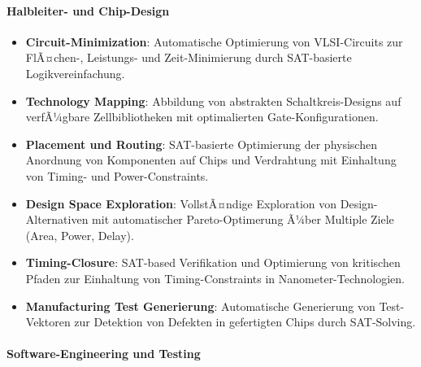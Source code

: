 ﻿\documentclass[a4paper,12pt]{article}
\theoremstyle{definition}
\begin{document}
\paragraph{Halbleiter- und Chip-Design}

\begin{itemize}
	\item \textbf{Circuit-Minimization}: Automatische Optimierung von VLSI-Circuits zur FlÃ¤chen-, Leistungs- und Zeit-Minimierung durch SAT-basierte Logikvereinfachung.
	
	\item \textbf{Technology Mapping}: Abbildung von abstrakten Schaltkreis-Designs auf verfÃ¼gbare Zellbibliotheken mit optimalierten Gate-Konfigurationen.
	
	\item \textbf{Placement und Routing}: SAT-basierte Optimierung der physischen Anordnung von Komponenten auf Chips und Verdrahtung mit Einhaltung von Timing- und Power-Constraints.
	
	\item \textbf{Design Space Exploration}: VollstÃ¤ndige Exploration von Design-Alternativen mit automatischer Pareto-Optimerung Ã¼ber Multiple Ziele (Area, Power, Delay).
	
	\item \textbf{Timing-Closure}: SAT-based Verifikation und Optimierung von kritischen Pfaden zur Einhaltung von Timing-Constraints in Nanometer-Technologien.
	
	\item \textbf{Manufacturing Test Generierung}: Automatische Generierung von Test-Vektoren zur Detektion von Defekten in gefertigten Chips durch SAT-Solving.
\end{itemize}

\paragraph{Software-Engineering und Testing}
\end{document}
